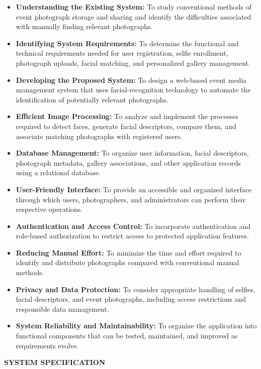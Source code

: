 \begin{itemize}
    \item \textbf{Understanding the Existing System:} To study conventional methods of event photograph storage and sharing and identify the difficulties associated with manually finding relevant photographs.
    \item \textbf{Identifying System Requirements:} To determine the functional and technical requirements needed for user registration, selfie enrollment, photograph uploads, facial matching, and personalized gallery management.
    \item \textbf{Developing the Proposed System:} To design a web-based event media management system that uses facial-recognition technology to automate the identification of potentially relevant photographs.
    \item \textbf{Efficient Image Processing:} To analyze and implement the processes required to detect faces, generate facial descriptors, compare them, and associate matching photographs with registered users.
    \item \textbf{Database Management:} To organize user information, facial descriptors, photograph metadata, gallery associations, and other application records using a relational database.
    \item \textbf{User-Friendly Interface:} To provide an accessible and organized interface through which users, photographers, and administrators can perform their respective operations.
    \item \textbf{Authentication and Access Control:} To incorporate authentication and role-based authorization to restrict access to protected application features.
    \item \textbf{Reducing Manual Effort:} To minimize the time and effort required to identify and distribute photographs compared with conventional manual methods.
    \item \textbf{Privacy and Data Protection:} To consider appropriate handling of selfies, facial descriptors, and event photographs, including access restrictions and responsible data management.
    \item \textbf{System Reliability and Maintainability:} To organize the application into functional components that can be tested, maintained, and improved as requirements evolve.
\end{itemize}

\clearpage
\begin{center}
    \vspace*{\fill}
    \fontsize{28}{28}\selectfont \textbf{SYSTEM SPECIFICATION}
    \vspace*{\fill}
\end{center}

